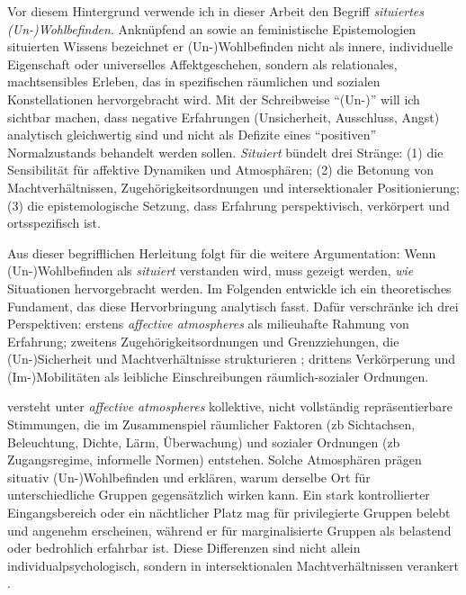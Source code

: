 Vor diesem Hintergrund verwende ich in dieser Arbeit den Begriff \emph{situiertes (Un-)Wohlbefinden}. Anknüpfend an \textcite{leeUnderstandingDisruptedParticipation2021} sowie an feministische Epistemologien situierten Wissens \parencite{harawaySituatedKnowledgesScience1988} bezeichnet er (Un-)Wohlbefinden nicht als innere, individuelle Eigenschaft oder universelles Affektgeschehen, sondern als relationales, machtsensibles Erleben, das in spezifischen räumlichen und sozialen Konstellationen hervorgebracht wird. Mit der Schreibweise \enquote{(Un-)} will ich sichtbar machen, dass negative Erfahrungen (Unsicherheit, Ausschluss, Angst) analytisch gleichwertig sind und nicht als Defizite eines \enquote{positiven} Normalzustands behandelt werden sollen. \emph{Situiert} bündelt drei Stränge: (1) die Sensibilität für affektive Dynamiken und Atmosphären; (2) die Betonung von Machtverhältnissen, Zugehörigkeitsordnungen und intersektionaler Positionierung; (3) die epistemologische Setzung, dass Erfahrung perspektivisch, verkörpert und ortsspezifisch ist.

\vspace{1em}

Aus dieser begrifflichen Herleitung folgt für die weitere Argumentation: Wenn (Un-)Wohlbefinden als \emph{situiert} verstanden wird, muss gezeigt werden, \emph{wie} Situationen hervorgebracht werden. Im Folgenden entwickle ich ein theoretisches Fundament, das diese Hervorbringung analytisch fasst. Dafür verschränke ich drei Perspektiven: erstens \emph{affective atmospheres} als milieuhafte Rahmung von Erfahrung; zweitens Zugehörigkeitsordnungen und Grenzziehungen, die (Un-)Sicherheit und Machtverhältnisse strukturieren ; drittens Verkörperung und (Im-)Mobilitäten als leibliche Einschreibungen räumlich-sozialer Ordnungen.

\textcite{andersonAffectiveAtmospheres2009} versteht unter \emph{affective atmospheres} kollektive, nicht vollständig repräsentierbare Stimmungen, die im Zusammenspiel räumlicher Faktoren (\gls{zb} Sichtachsen, Beleuchtung, Dichte, Lärm, Überwachung) und sozialer Ordnungen (\gls{zb} Zugangsregime, informelle Normen) entstehen. Solche Atmosphären prägen situativ (Un-)Wohlbefinden und erklären, warum derselbe Ort für unterschiedliche Gruppen gegensätzlich wirken kann. Ein stark kontrollierter Eingangsbereich oder ein nächtlicher Platz mag für privilegierte Gruppen belebt und angenehm erscheinen, während er für marginalisierte Gruppen als belastend oder bedrohlich erfahrbar ist. Diese Differenzen sind nicht allein individualpsychologisch, sondern in intersektionalen Machtverhältnissen verankert \parencite{valentineTheorizingResearchingIntersectionality2007,rodo-de-zarateIntersectionalityFeministGeographies2018,rodo-de-zarateIntersectionalitySpatialityEmotions2023}.

